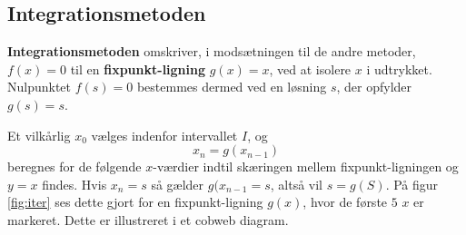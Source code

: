 \subsection*{Integrationsmetoden}
\textbf{Integrationsmetoden} omskriver, i modsætningen til de andre metoder, $f(x)=0$ til en \textbf{fixpunkt-ligning} $g(x)=x$, ved at isolere $x$ i udtrykket. Nulpunktet $f(s)=0$ bestemmes dermed ved en løsning $s$, der opfylder $g(s)=s$.

Et vilkårlig $x_0$ vælges indenfor intervallet $I$, og $$x_n=g(x_{n-1})$$
beregnes for de følgende $x$-værdier indtil skæringen mellem fixpunkt-ligningen og $y=x$ findes. 
Hvis $x_n=s$ så gælder $g(x_{n-1}=s$, altså vil $s=g(S)$.
På figur \ref{fig:iter} ses dette gjort for en fixpunkt-ligning $g(x)$, hvor de første $5$ $x$ er markeret. Dette er illustreret i et cobweb diagram. 
%
%
